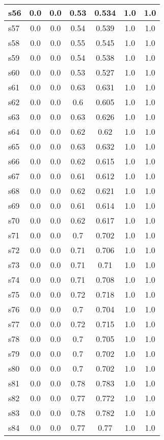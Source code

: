 \documentclass{article}
\begin{document}
\begin{tabular}{|l|c|c|c|c|c|c|}
\hline
s56 &0.0 & 0.0 & 0.53 & 0.534 & 1.0 & 1.0\\
\hline
s57 &0.0 & 0.0 & 0.54 & 0.539 & 1.0 & 1.0\\
\hline
s58 &0.0 & 0.0 & 0.55 & 0.545 & 1.0 & 1.0\\
\hline
s59 &0.0 & 0.0 & 0.54 & 0.538 & 1.0 & 1.0\\
\hline
s60 &0.0 & 0.0 & 0.53 & 0.527 & 1.0 & 1.0\\
\hline
s61 &0.0 & 0.0 & 0.63 & 0.631 & 1.0 & 1.0\\
\hline
s62 &0.0 & 0.0 & 0.6 & 0.605 & 1.0 & 1.0\\
\hline
s63 &0.0 & 0.0 & 0.63 & 0.626 & 1.0 & 1.0\\
\hline
s64 &0.0 & 0.0 & 0.62 & 0.62 & 1.0 & 1.0\\
\hline
s65 &0.0 & 0.0 & 0.63 & 0.632 & 1.0 & 1.0\\
\hline
s66 &0.0 & 0.0 & 0.62 & 0.615 & 1.0 & 1.0\\
\hline
s67 &0.0 & 0.0 & 0.61 & 0.612 & 1.0 & 1.0\\
\hline
s68 &0.0 & 0.0 & 0.62 & 0.621 & 1.0 & 1.0\\
\hline
s69 &0.0 & 0.0 & 0.61 & 0.614 & 1.0 & 1.0\\
\hline
s70 &0.0 & 0.0 & 0.62 & 0.617 & 1.0 & 1.0\\
\hline
s71 &0.0 & 0.0 & 0.7 & 0.702 & 1.0 & 1.0\\
\hline
s72 &0.0 & 0.0 & 0.71 & 0.706 & 1.0 & 1.0\\
\hline
s73 &0.0 & 0.0 & 0.71 & 0.71 & 1.0 & 1.0\\
\hline
s74 &0.0 & 0.0 & 0.71 & 0.708 & 1.0 & 1.0\\
\hline
s75 &0.0 & 0.0 & 0.72 & 0.718 & 1.0 & 1.0\\
\hline
s76 &0.0 & 0.0 & 0.7 & 0.704 & 1.0 & 1.0\\
\hline
s77 &0.0 & 0.0 & 0.72 & 0.715 & 1.0 & 1.0\\
\hline
s78 &0.0 & 0.0 & 0.7 & 0.705 & 1.0 & 1.0\\
\hline
s79 &0.0 & 0.0 & 0.7 & 0.702 & 1.0 & 1.0\\
\hline
s80 &0.0 & 0.0 & 0.7 & 0.702 & 1.0 & 1.0\\
\hline
s81 &0.0 & 0.0 & 0.78 & 0.783 & 1.0 & 1.0\\
\hline
s82 &0.0 & 0.0 & 0.77 & 0.772 & 1.0 & 1.0\\
\hline
s83 &0.0 & 0.0 & 0.78 & 0.782 & 1.0 & 1.0\\
\hline
s84 &0.0 & 0.0 & 0.77 & 0.77 & 1.0 & 1.0\\

\end{tabular}
\end{document}
